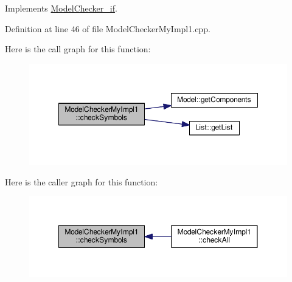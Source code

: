 Implements \hyperlink{class_model_checker__if_a92ab650708e675a1818b41fe4eb93a59}{Model\-Checker\-\_\-if}.



Definition at line 46 of file Model\-Checker\-My\-Impl1.\-cpp.



Here is the call graph for this function\-:\nopagebreak
\begin{figure}[H]
\begin{center}
\leavevmode
\includegraphics[width=350pt]{class_model_checker_my_impl1_a37856818d6597563f079401bf6652cbb_cgraph}
\end{center}
\end{figure}




Here is the caller graph for this function\-:
\nopagebreak
\begin{figure}[H]
\begin{center}
\leavevmode
\includegraphics[width=350pt]{class_model_checker_my_impl1_a37856818d6597563f079401bf6652cbb_icgraph}
\end{center}
\end{figure}


